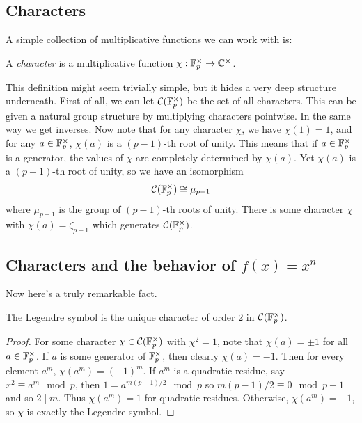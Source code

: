 \documentclass[utf8, letterpaper]{article}
\begin{document}
\subsection{Characters}

A simple collection of multiplicative functions we can work with is:

\begin{definition}
    A \emph{character} is a multiplicative function $\chi : \mathbb{F}_p^\times \to \mathbb{C}^\times$. 
\end{definition}

This definition might seem trivially simple, but it hides a very deep structure underneath. First of all, we can let $\mathcal{C}(\mathbb{F}_p^\times)$ be the set of all characters. This can be given a natural group structure by multiplying characters pointwise. In the same way we get inverses. Now note that for any character $\chi$, we have $\chi(1)=1$, and for any $a\in \mathbb{F}_p^\times$, $\chi(a)$ is a $(p-1)$-th root of unity. This means that if $a\in \mathbb{F}_p^\times$ is a generator, the values of $\chi$ are completely determined by $\chi(a)$. Yet $\chi(a)$ is a $(p-1)$-th root of unity, so we have an isomorphism
\[
    \mathcal{C}(\mathbb{F}_p^\times)\cong \mu_{p-1}
\]
where $\mu_{p-1}$ is the group of $(p-1)$-th roots of unity. There is some character $\chi$ with $\chi(a)=\zeta_{p-1}$ which generates $\mathcal{C}(\mathbb{F}_p^\times)$.


\subsection{Characters and the behavior of $f(x)=x^n$}

Now here's a truly remarkable fact.

\begin{proposition}
    The Legendre symbol is the unique character of order $2$ in $\mathcal{C}(\mathbb{F}_p^\times)$. 
\end{proposition}
\begin{proof}
    For some character $\chi \in \mathcal{C}(\mathbb{F}_p^\times)$ with $\chi^2=1$, note that $\chi(a)=\pm 1$ for all $a\in \mathbb{F}_p^\times$. If $a$ is some generator of $\mathbb{F}_p^\times$, then clearly $\chi(a)=-1$. Then for every element $a^m$, $\chi(a^m)=(-1)^m$. If $a^m$ is a quadratic residue, say $x^2\equiv a^m\mod p$, then $1=a^{m(p-1) /2}\mod p$ so $m(p-1)/2\equiv 0\mod p-1$ and so $2\mid m$. Thus $\chi(a^m)=1$ for quadratic residues. Otherwise, $\chi(a^m)=-1$, so $\chi$ is exactly the Legendre symbol.    
\end{proof}
\end{document}
